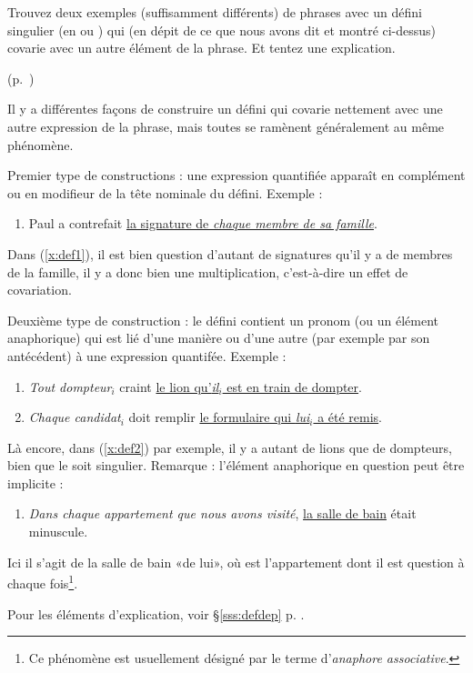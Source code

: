 \begin{exo}\label{exo:DefCovar}
Trouvez deux exemples (suffisamment différents) de phrases avec un {\GN}
%
défini singulier (en  ou ) qui (en dépit de ce que nous avons
dit et montré ci-dessus) covarie avec un autre élément de la phrase.
Et tentez une explication.
\begin{solu} (p.~\pageref{exo:DefCovar})\label{crg:DefCovar}

Il y a différentes façons de construire un {\GN} défini qui covarie
nettement avec une autre expression de la phrase, mais toutes se
ramènent généralement au même phénomène.

Premier type de constructions : une expression quantifiée apparaît en
complément ou en modifieur de la tête nominale du {\GN} défini.  Exemple :

\begin{enumerate}[label=(\arabic*)]
\item \label{x:def1}
Paul a contrefait \underline{la signature de \emph{chaque membre
  de sa famille}}.
\end{enumerate}


Dans (\ref{x:def1}), il est bien question d'autant de signatures qu'il
y a de membres de la famille, il y a donc bien une multiplication,
c'est-à-dire un effet de covariation.

Deuxième type de construction : le {\GN} défini contient un pronom (ou un
élément anaphorique) qui est lié d'une manière ou d'une autre (par
exemple par son antécédent) à une expression quantifée.  Exemple :

\begin{enumerate}[label=(\arabic*),resume]
\item \label{x:def2}
\emph{Tout dompteur$_i$} craint \underline{le lion qu'\emph{il$_i$}
est en train de dompter}. 

\item
\emph{Chaque candidat$_i$} doit remplir \underline{le formulaire qui
\emph{lui$_i$} a été remis}.
\end{enumerate}

Là encore, dans (\ref{x:def2}) par exemple, il y a autant de lions que
de dompteurs, bien que le {\GN} soit singulier.
Remarque : l'élément anaphorique en question peut être implicite :

\begin{enumerate}[label=(\arabic*),resume]
\item \emph{Dans chaque appartement que nous avons visité}, \underline{la salle de bain} était minuscule.
\end{enumerate}

Ici il s'agit de la salle de bain «de lui», où 
est l'appartement dont il est question à chaque fois\footnote{Ce phénomène est usuellement désigné par le terme d'\emph{anaphore associative}.}.

Pour les éléments d'explication, voir \S\ref{sss:defdep} p. \pageref{sss:defdep}.

\end{solu}
\end{exo}
